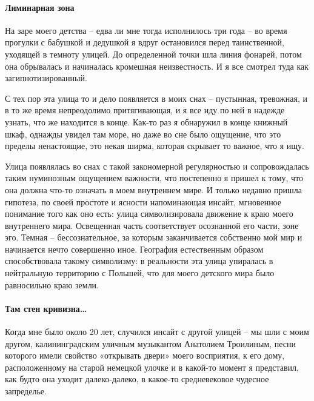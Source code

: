 \paragraph*{Лиминарная зона}
На заре моего детства – едва ли мне тогда исполнилось три года – во время прогулки с бабушкой и дедушкой я вдруг остановился перед таинственной, уходящей в темноту улицей. До определенной точки шла линия фонарей, потом она обрывалась и начиналась кромешная неизвестность. И я все смотрел туда как загипнотизированный.

С тех пор эта улица то и дело появляется в моих снах – пустынная, тревожная, и в то же время непреодолимо притягивающая, и я все иду по ней в надежде узнать, что же находится в конце. Как-то раз я обнаружил в конце книжный шкаф, однажды увидел там море, но даже во сне было ощущение, что это пределы ненастоящие, это некая ширма, которая скрывает то важное, что я ищу.

Улица появлялась во снах с такой закономерной регулярностью и сопровождалась таким нуминозным ощущением важности, что постепенно я пришел к тому, что она должна что-то означать в моем внутреннем мире. И только недавно пришла гипотеза, по своей простоте и ясности напоминающая инсайт, мгновенное понимание того как оно есть: улица символизировала движение к краю моего внутреннего мира. Освещенная часть соответствует осознанной его части, зоне эго. Темная – бессознательное, за которым заканчивается собственно мой мир и начинается нечто совершенно иное. География естественным образом способствовала такому символизму: в реальности эта улица упиралась в нейтральную территорию с Польшей, что для моего детского мира было равносильно краю земли.

\paragraph*{Там стен кривизна…}
Когда мне было около 20 лет, случился инсайт с другой улицей – мы шли с моим другом, калининградским уличным музыкантом Анатолием Троилиным, песни которого имели свойство «открывать двери» моего восприятия, к его дому, расположенному на старой немецкой улочке и в какой-то момент я представил, как будто она уходит далеко-далеко, в какое-то средневековое чудесное запределье.

